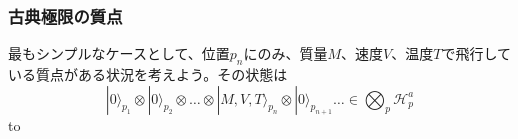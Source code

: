 \subsubsection{古典極限の質点}
最もシンプルなケースとして、位置$p_n$にのみ、質量$M$、速度$V$、温度$T$で飛行している質点がある状況を考えよう。その状態は
\begin{equation}
    |0\rangle_{p_1} \otimes |0\rangle_{p_2} \otimes \ldots \otimes |M,V,T\rangle_{p_n} \otimes |0\rangle_{p_{n+1}} \ldots \in \bigotimes_p \mathcal{H}_p^a
\end{equation}
to